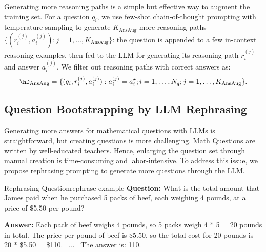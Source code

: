 Generating more reasoning paths 
is a simple but effective way
to augment 
the training set.
For a question $q_i$,
we 
use few-shot chain-of-thought prompting with temperature sampling 
to generate $K_{\text{AnsAug}}$ more reasoning paths $\{(r_i^{(j)}, a_i^{(j)}): j=1,\dots, K_{\text{AnsAug}}\}$:
the question is appended to a few in-context reasoning examples,
then fed to the LLM
for generating its reasoning path $r_i^{(j)}$ and answer $a_i^{(j)}$.
We filter out reasoning paths with correct answers as:
\begin{equation}
\small
\hD_{\text{AnsAug}} = \{(q_i, r_i^{(j)}, a_i^{(j)}): a_i^{(j)} = a_i^\star;  i=1,\dots, N_q; j=1,\dots, K_{\text{AnsAug}}\}.
\end{equation}

\subsection{Question Bootstrapping by LLM Rephrasing}
\vspace{-1mm}

Generating more answers for mathematical questions with LLMs is straightforward, but creating questions is more challenging. Math Questions
are written by well-educated teachers. Hence, enlarging the question set through manual creation is time-consuming and labor-intensive. To address this issue, we propose rephrasing prompting to generate more questions through the LLM. 

\vspace{2mm}
\begin{exmp}{Rephrasing Question}{rephrase-example}
\small
\textbf{Question:} What is the total amount that James paid when he purchased 5 packs of beef, each weighing 4 pounds, at a price of \$5.50 per pound? 

\textbf{Answer:} Each pack of beef weighs 4 pounds, so 5 packs weigh 4 * 5 = 20 pounds in total. The price per pound of beef is \$5.50, so the total cost for 20 pounds is 20 * \$5.50 = \$110. ~...~
The answer is: 110.
\end{exmp}
\vspace{2.5mm}

